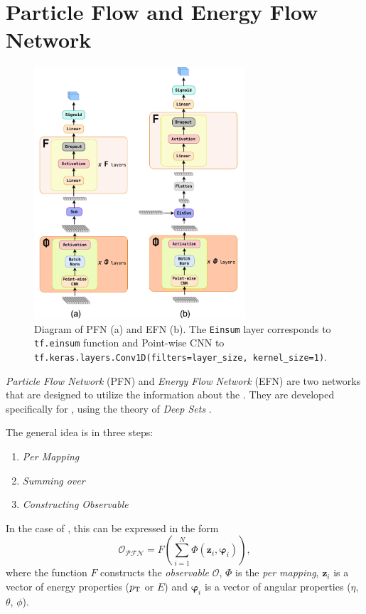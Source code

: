 \section{Particle Flow and Energy Flow Network}
\label{sec:pfn_efn}

\begin{figure}[htb]
    \centering
    \includegraphics[width=0.7\textwidth]{src/diagrams/pfn_efn.png}
    \caption{Diagram of PFN (a) and EFN (b). The \texttt{Einsum} layer corresponds to \texttt{tf.einsum} function and Point-wise CNN to \texttt{tf.keras.layers.Conv1D(filters=layer\_size, kernel\_size=1)}.}
    \label{fig:pfn_efn}
\end{figure}

\emph{Particle Flow Network} (PFN) and \emph{Energy Flow Network} (EFN) \cite{efn} are two networks that are designed to utilize the information about the \PFOs.
They are developed specifically for \HEP, using the theory of \emph{Deep Sets} \cite{deep_set}.

The general idea is in three steps:
\begin{enumerate}
    \item \emph{Per \PFO Mapping}   
    \item \emph{Summing over \PFOs} 
    \item \emph{Constructing Observable}
\end{enumerate}

In the case of \PFN, this can be expressed in the form 
\begin{equation}
    \label{eq:pfn}
  \mathcal{O_{\text{PFN}}} = F\left(\sum_{i=1}^N \Phi(\pmb{z}_i, \pmb{\varphi}_i )\right), 
\end{equation}  
where the function $F$ constructs the \emph{observable} $\mathcal{O}$, $\Phi$ is the \emph{per \PFO mapping}, $\pmb{z}_i$ is a vector of \PFO energy properties ($p_\text{T}$ or $E$) and $\pmb{\varphi}_i$ is a vector of \PFO angular properties ($\eta$, $\theta$, $\phi$).

